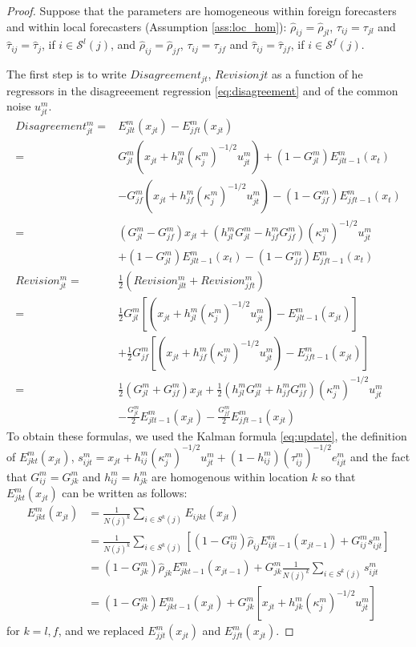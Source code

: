\begin{proof}

Suppose that the parameters are homogeneous within foreign forecasters and within local forecasters (Assumption \ref{ass:loc_hom}): $\hat\rho_{ij}=\hat\rho_{jl}$, $\tau_{ij}=\tau_{jl}$ and $\hat\tau_{ij}=\hat\tau_{j}$, if $i\in\mathcal{S}^l(j)$, and $\hat\rho_{ij}=\hat\rho_{jf}$, $\tau_{ij}=\tau_{jf}$ and $\hat\tau_{ij}=\hat\tau_{jf}$, if $i\in\mathcal{S}^f(j)$.

The first step is to write $Disagreement_{jt}$, $Revision{jt}$ as a function of he regressors in the disagreeement regression \eqref{eq:disagreement} and of the common noise $u_{jt}^m$.
$$\begin{array}{rl}
Disagreement_{jt}^m=&E_{jlt}^m(x_{jt})-E_{jft}^m(x_{jt})\\
									=&G_{jl}^m(x_{jt}+h_{jl}^m(\kappa_j^m)^{-1/2}u_{jt}^m)+(1-G_{jl}^m)E_{jlt-1}^m(x_{t})\\
								&-G_{jf}^m(x_{jt}+h_{jf}^m(\kappa_j^m)^{-1/2}u_{jt}^m)-(1-G_{jf}^m)E_{jft-1}^m(x_{t})\\
								=&(G_{jl}^m-G_{jf}^m)x_{jt}+(h_{jl}^mG_{jl}^m-h_{jf}^mG_{jf}^m)(\kappa_j^m)^{-1/2}u_{jt}^m\\
								&+(1-G_{jl}^m)E_{jlt-1}^m(x_{t})-(1-G_{jf}^m)E_{jft-1}^m(x_{t})\\
Revision_{jt}^m=&\frac{1}{2}(Revision_{jlt}^m+Revision_{jft}^m)\\
						=&\frac{1}{2}G_{jl}^m[(x_{jt}+h_{jl}^m(\kappa_j^m)^{-1/2}u_{jt}^m)-E_{jlt-1}^m(x_{jt})]\\
						&+\frac{1}{2}G_{jf}^m[(x_{jt}+h_{jf}^m(\kappa_j^m)^{-1/2}u_{jt}^m)-E_{jft-1}^m(x_{jt})]\\
						=&\frac{1}{2}(G_{jl}^m+G_{jf}^m)x_{jt}+\frac{1}{2}(h_{jl}^mG_{jl}^m+h_{jf}^mG_{jf}^m)(\kappa_j^m)^{-1/2}u_{jt}^m\\
						&-\frac{G_{jl}^m}{2}E_{jlt-1}^m(x_{jt})-\frac{G_{jf}^m}{2}E_{jft-1}^m(x_{jt})
\end{array}$$		
To obtain these formulas, we used the Kalman formula \eqref{eq:update}, the definition of $E_{jkt}^m(x_{jt})$, $s_{ijt}^m=x_{jt}+h_{ij}^m(\kappa_{j}^m)^{-1/2}u_{jt}^m+(1-h_{ij}^m)(\tau_{ij}^m)^{-1/2}e_{ijt}^m$ and the fact that $G_{ij}^m=G_{jk}^m$ and $h_{ij}^m=h_{jk}^m$ are homogenous within location $k$ so that $E_{jkt}^m(x_{jt})$ can be written as follows:
$$\begin{array}{ll}E_{jkt}^m(x_{jt})&=\frac{1}{N(j)^k}\sum_{i\in\textit{S}^k(j)}E_{ijkt}(x_{jt})\\
&=\frac{1}{N(j)^k}\sum_{i\in\textit{S}^k(j)}\left[(1-G_{ij}^m)\hat\rho_{ij}E_{ijt-1}^m(x_{jt-1})+G_{ij}^ms_{ijt}^m\right]\\
&=(1-G_{jk}^m)\hat\rho_{jk}E_{jkt-1}^m(x_{jt-1})+G_{jk}^m\frac{1}{N(j)^k}\sum_{i\in\textit{S}^k(j)}s_{ijt}^m\\
&=(1-G_{jk}^m)E_{jkt-1}^m(x_{jt})+G_{jk}^m[x_{jt}+h_{jk}^m(\kappa_{j}^m)^{-1/2}u_{jt}^m]
\end{array}$$ for $k=l,f$, and we replaced $E_{jjt}^m(x_{jt})$ and $E_{jft}^m(x_{jt})$.



\end{proof}
